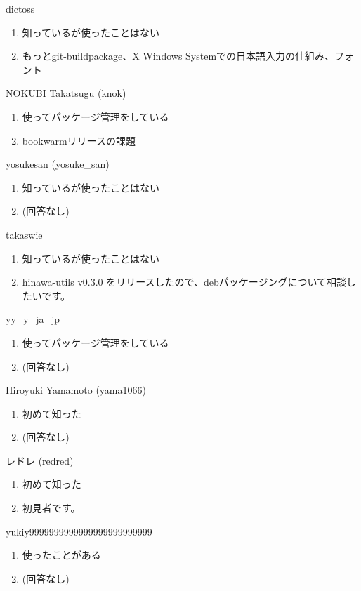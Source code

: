 \begin{prework}{ dictoss }
  \begin{enumerate}
  \item 知っているが使ったことはない
  \item もっとgit-buildpackage、X Windows Systemでの日本語入力の仕組み、フォント
  \end{enumerate}
\end{prework}

\begin{prework}{ NOKUBI Takatsugu (knok) }
  \begin{enumerate}
  \item 使ってパッケージ管理をしている
  \item bookwarmリリースの課題
  \end{enumerate}
\end{prework}

\begin{prework}{ yosukesan (yosuke\_san) }
  \begin{enumerate}
  \item 知っているが使ったことはない
  \item (回答なし)
  \end{enumerate}
\end{prework}

\begin{prework}{ takaswie }
  \begin{enumerate}
  \item 知っているが使ったことはない
  \item hinawa-utils v0.3.0 をリリースしたので、debパッケージングについて相談したいです。
  \end{enumerate}
\end{prework}

\begin{prework}{ yy\_y\_ja\_jp }
  \begin{enumerate}
  \item 使ってパッケージ管理をしている
  \item (回答なし)
  \end{enumerate}
\end{prework}

\begin{prework}{ Hiroyuki Yamamoto (yama1066) }
  \begin{enumerate}
  \item 初めて知った
  \item (回答なし)
  \end{enumerate}
\end{prework}

\begin{prework}{ レドレ (redred) }
  \begin{enumerate}
  \item 初めて知った
  \item 初見者です。
  \end{enumerate}
\end{prework}

\begin{prework}{ yukiy9999999999999999999999999 }
  \begin{enumerate}
  \item 使ったことがある
  \item (回答なし)
  \end{enumerate}
\end{prework}
